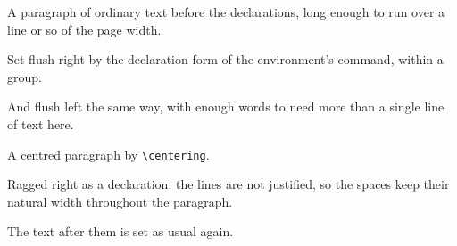 \documentclass{article}
\begin{document}
A paragraph of ordinary text before the declarations, long enough to run over a line or so of the page width.

{\flushright Set flush right by the declaration form of the environment's command, within a group.\par}

{\flushleft And flush left the same way, with enough words to need more than a single line of text here.\par}

{\centering A centred paragraph by \verb|\centering|.\par}

{\raggedright Ragged right as a declaration: the lines are not justified, so the spaces keep their natural width throughout the paragraph.\par}

The text after them is set as usual again.
\end{document}
